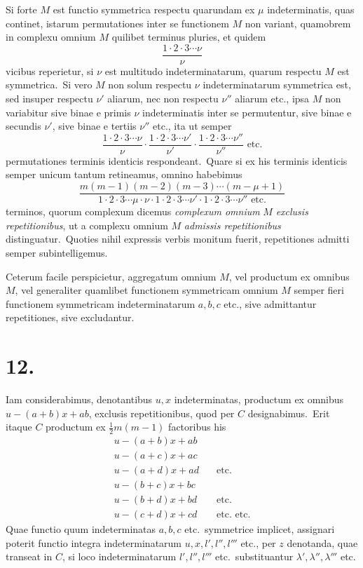 \documentclass[12pt,a4paper]{article}
\theoremstyle{plain}
\begin{document}
Si forte $M$ est functio symmetrica respectu quarundam ex $\mu$ indeterminatis, quas continet, istarum permutationes inter se functionem $M$ non variant, quamobrem in complexu omnium $M$ quilibet terminus pluries, et quidem
\[
\frac{1 \cdot 2 \cdot 3 \cdots \nu}{\nu}
\]
vicibus reperietur, si $\nu$ est multitudo indeterminatarum, quarum
respectu $M$ est symmetrica.\ Si vero $M$ non solum respectu $\nu$ indeterminatarum
symmetrica est, sed insuper respectu $\nu'$ aliarum, nec non respectu $\nu''$ aliarum etc.,
ipsa $M$ non variabitur sive binae e primis $\nu$ indeterminatis inter se permutentur,
sive binae e secundis $\nu'$, sive binae e tertiis $\nu''$ etc., ita ut semper
\[
\frac{1 \cdot 2 \cdot 3 \cdots \nu}{\nu} \cdot \frac{1 \cdot 2 \cdot 3 \cdots \nu'}{\nu'} \cdot \frac{1 \cdot 2 \cdot 3 \cdots \nu''}{\nu''} \text{ etc.}
\]
permutationes terminis identicis respondeant.\ Quare si ex his terminis identicis
semper unicum tantum retineamus, omnino habebimus
\[
\frac{m(m-1)(m-2)(m-3) \cdots (m-\mu+1)}{1 \cdot 2 \cdot 3 \cdots \mu \cdot \nu \cdot 1 \cdot 2 \cdot 3 \cdots \nu' \cdot 1 \cdot 2 \cdot 3 \cdots \nu'' \text{ etc.}}
\]
terminos, quorum complexum dicemus \textit{complexum omnium} $M$ \textit{exclusis repetitionibus}, ut a complexu omnium $M$ \textit{admissis repetitionibus} distinguatur.\ Quoties nihil
expressis verbis monitum fuerit, repetitiones admitti semper subintelligemus.

Ceterum facile perspicietur, aggregatum omnium $M$, vel productum ex
omnibus $M$, vel generaliter quamlibet functionem symmetricam omnium $M$ semper fieri functionem symmetricam indeterminatarum $a, b, c$ etc., sive admittantur repetitiones, sive excludantur.

\section*{12.}

Iam considerabimus, denotantibus $u, x$ indeterminatas, productum ex omnibus $u - (a+b)x + ab$, exclusis repetitionibus, quod per $C$ designabimus.\ Erit
itaque $C$ productum ex $\frac{1}{2}m(m-1)$ factoribus his
\begin{align*}
u - (a+b)x + ab \\
u - (a+c)x + ac \\
u - (a+d)x + ad &\quad \text{etc.} \\
u - (b+c)x + bc \\
u - (b+d)x + bd &\quad \text{etc.} \\
u - (c+d)x + cd &\quad \text{etc.\ etc.}
\end{align*}
Quae functio quum indeterminatas $a, b, c$ etc.\ symmetrice implicet, assignari
poterit functio integra indeterminatarum $u, x, l', l'', l'''$ etc., per $z$ denotanda,
quae transeat in $C$, si loco indeterminatarum $l', l'', l'''$ etc.\ substituantur $\lambda', \lambda'', \lambda'''$ etc.
\end{document}
